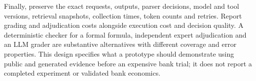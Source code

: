 Finally, preserve the exact requests, outputs, parser decisions, model and tool
versions, retrieval snapshots, collection times, token counts and retries.
Report grading and adjudication costs alongside execution cost and decision
quality. A deterministic checker for a formal formula, independent expert
adjudication and an LLM grader are substantive alternatives with different
coverage and error properties. This design specifies what a prototype should
demonstrate using public and generated evidence before an expensive bank trial;
it does not report a completed experiment or validated bank economics.

